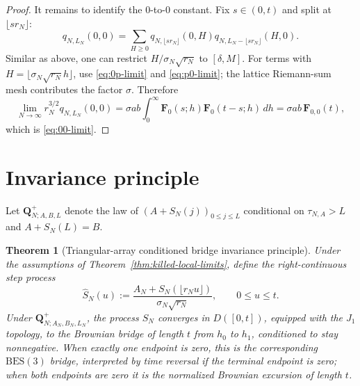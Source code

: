 \documentclass[11pt]{article}
\theoremstyle{plain}
\newtheorem{theorem}[lemma]{Theorem}
\theoremstyle{definition}
\theoremstyle{remark}
\begin{document}
\begin{proof}
It remains to identify the \(0\)-to-\(0\) constant.  Fix
\(s\in(0,t)\) and split at \(\lfloor sr_N\rfloor\):
\[
 q_{N,L_N}(0,0)
 =\sum_{H\ge0}
 q_{N,\lfloor sr_N\rfloor}(0,H)
 q_{N,L_N-\lfloor sr_N\rfloor}(H,0).
\]
Similar as above, one can restrict $H/\sigma_N\sqrt{r_N}$ to $[\delta,M]$. For terms with
\(H=\lfloor\sigma_N\sqrt{r_N}h\rfloor\), use
\eqref{eq:0p-limit} and \eqref{eq:p0-limit}; the lattice Riemann-sum mesh
contributes the factor \(\sigma\).  Therefore
\[
 \lim_{N\to\infty}r_N^{3/2}q_{N,L_N}(0,0)
 =\sigma ab\int_0^\infty
 \mathbf F_0(s;h)\mathbf F_0(t-s;h)\,dh
 =\sigma ab\,\mathbf F_{0,0}(t),
\]
which is \eqref{eq:00-limit}.


\end{proof}

\section{Invariance principle}

Let \(\mathbf Q_{N;A,B,L}^{+}\) denote the law of
\((A+S_N(j))_{0\le j\le L}\) conditional on
\(\tau_{N,A}>L\) and \(A+S_N(L)=B\).

\begin{theorem}[Triangular-array conditioned bridge invariance principle]
\label{thm:bridge-fclt}
Under the assumptions of Theorem~\ref{thm:killed-local-limits}, define
the right-continuous step process
\[
 \widehat S_N(u)
 :=
 \frac{A_N+S_N(\lfloor r_Nu\rfloor)}
      {\sigma_N\sqrt{r_N}},
 \qquad 0\le u\le t .
\]
Under \(\mathbf Q_{N;A_N,B_N,L_N}^{+}\), the process
\(\widehat S_N\) converges in \(D([0,t])\), equipped with the \(J_1\)
topology, to the Brownian bridge of length \(t\) from \(h_0\) to \(h_1\),
conditioned to stay nonnegative. When exactly one endpoint is zero, this is
the corresponding
\(\mathrm{BES}(3)\) bridge, interpreted by time reversal if the terminal
endpoint is zero; when both endpoints are zero it is the normalized
Brownian excursion of length \(t\).
\end{theorem}
\end{document}
